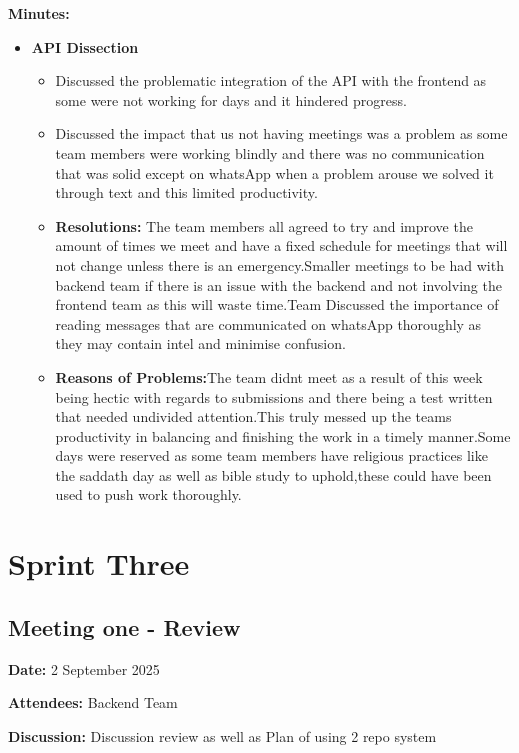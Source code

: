 \textbf{Minutes:}
\begin{itemize}
    \item \textbf{API Dissection}
    \begin{itemize}
        \item Discussed the problematic integration of the API with the frontend as some were not working for days and it hindered progress. 
        \item Discussed the impact that us not having meetings was a problem as some team members were working blindly and there was no communication that was solid except on whatsApp when a problem arouse we solved it through text and this limited productivity.
        \item \textbf{Resolutions:} The team members all agreed to try and improve the amount of times we meet and have a fixed schedule for meetings that will not change unless there is an emergency.Smaller meetings to be had with backend team if there is an issue with the backend and not involving the frontend team as this will waste time.Team Discussed the importance of reading messages that are communicated on whatsApp thoroughly as they may contain intel and minimise confusion.
        \item \textbf{Reasons of Problems:}The team didnt meet as a result of this week being hectic with regards to submissions and there being a test written that needed undivided attention.This truly messed up the teams productivity in balancing and finishing the work in a timely manner.Some days were reserved as some team members have religious practices like the saddath day as well as bible study to uphold,these could have been used to push work thoroughly.
    \end{itemize}
\end{itemize}

\section{Sprint Three}
\subsection{Meeting one - Review}
\textbf{Date:} 2 September 2025 \par
\textbf{Attendees:} Backend Team  \par
\textbf{Discussion:} Discussion review as well as Plan of using 2 repo system \par

